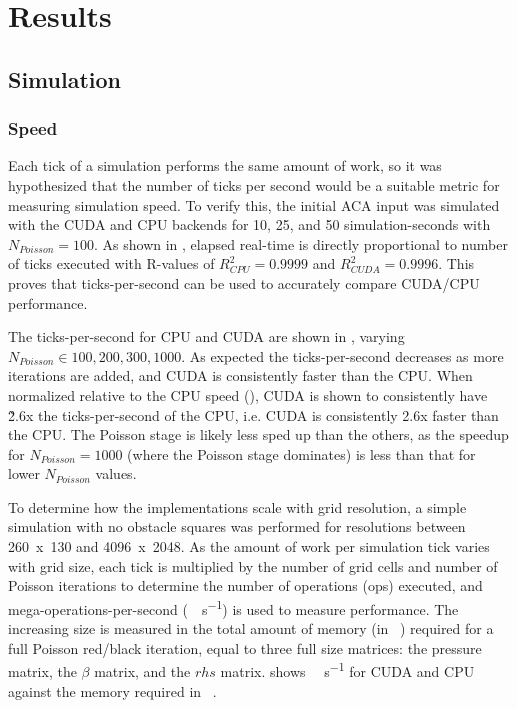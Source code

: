 
\newcommand{\npoisson}{N_{Poisson}}

\chapter{Results}\label{sec:Results}

\section{Simulation}

\subsection{Speed}\label{sec:Results:Sim:Speed}
Each tick of a simulation performs the same amount of work, so it was hypothesized that the number of ticks per second would be a suitable metric for measuring simulation speed.
To verify this, the initial ACA input was simulated with the CUDA and CPU backends for 10, 25, and 50 simulation-seconds with $\npoisson = 100$.
As shown in , elapsed real-time is directly proportional to number of ticks executed with R-values of $R^2_{CPU} = 0.9999$ and $R^2_{CUDA} = 0.9996$.
This proves that ticks-per-second can be used to accurately compare CUDA/CPU performance.

The ticks-per-second for CPU and CUDA are shown in , varying $\npoisson \in {100, 200, 300, 1000}$.
As expected the ticks-per-second decreases as more iterations are added, and CUDA is consistently faster than the CPU.
When normalized relative to the CPU speed (), CUDA is shown to consistently have \~2.6x the ticks-per-second of the CPU, i.e. CUDA is consistently 2.6x faster than the CPU. 
The Poisson stage is likely less sped up than the others, as the speedup for $\npoisson{} = 1000$ (where the Poisson stage dominates) is less than that for lower $\npoisson{}$ values.

To determine how the implementations scale with grid resolution, a simple simulation with no obstacle squares was performed for resolutions between 260~x~130 and 4096~x~2048.
As the amount of work per simulation tick varies with grid size, each tick is multiplied by the number of grid cells and number of Poisson iterations to determine the number of operations (\si{op}s) executed, and  mega-operations-per-second (\si{\mega\op\per\second}) is used to measure performance.
The increasing size is measured in the total amount of memory (in \si{\mega\byte}) required for a full Poisson red/black iteration, equal to three full size matrices: the pressure matrix, the $\beta$ matrix, and the $rhs$ matrix.
 shows \si{\mega\op\per\second} for CUDA and CPU against the memory required in \si{\mega\byte}.

